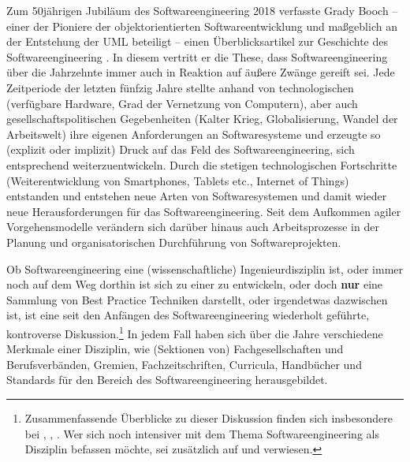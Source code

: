 Zum 50jährigen Jubiläum  des Softwareengineering 2018 verfasste Grady Booch – einer der Pioniere der objektorientierten Softwareentwicklung und maßgeblich an der Entstehung der UML beteiligt – einen Überblicksartikel zur Geschichte des Softwareengineering \cite{boo18}. 
In diesem vertritt er die These, dass Softwareengineering über die Jahrzehnte immer auch in Reaktion auf äußere Zwänge gereift sei. Jede Zeitperiode der letzten fünfzig Jahre stellte anhand von technologischen (\zb verfügbare Hardware, Grad der Vernetzung von Computern), aber auch gesellschaftspolitischen Gegebenheiten (\zb Kalter Krieg, Globalisierung, Wandel der Arbeitswelt) ihre eigenen Anforderungen an Softwaresysteme und erzeugte so (explizit oder implizit) Druck auf das Feld des Softwareengineering, sich entsprechend weiterzuentwickeln. Durch die stetigen technologischen Fortschritte (Weiterentwicklung von Smart\-phones, Tablets etc., Internet of Things) entstanden und entstehen neue Arten von Softwaresystemen und damit wieder neue Herausforderungen für das Softwareengineering. Seit dem Aufkommen agiler Vorgehensmodelle verändern sich darüber hinaus auch Arbeitsprozesse in der Planung und organisatorischen Durchführung von Softwareprojekten.

Ob Softwareengineering eine (wissenschaftliche) Ingenieurdisziplin ist, oder immer noch auf dem Weg dorthin ist sich zu einer zu entwickeln, oder doch \textbf{nur} eine Sammlung von Best Practice Techniken darstellt, oder irgendetwas dazwischen ist, ist eine seit den Anfängen des Softwareengineering wiederholt geführte, kontroverse Diskussion.\footnote{Zusammenfassende Überblicke zu dieser Diskussion finden sich insbesondere bei \cite{dia14}, \cite{mah04}, \cite{gri11}. Wer sich noch intensiver mit dem Thema Softwareengineering als Disziplin befassen möchte, sei zusätzlich auf \cite{sei14} und \cite{wan00} verwiesen.} 
In jedem Fall haben sich über die Jahre verschiedene Merkmale einer Disziplin, wie (Sektionen von) Fachgesellschaften und Berufsverbänden, Gremien, Fachzeitschriften, Curricula, Handbücher und Standards für den Bereich des Softwareengineering herausgebildet. 

